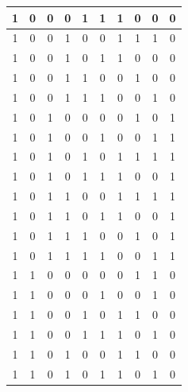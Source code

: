 \documentclass[fleqn]{article}
\begin{document}
\begin{latin}
\begin{center}
\begin{longtable}{|ccc|ccc||ccc|c|}
			1        & 0        & 0        & 0 & 1 & 1 & 1          & 0          & 0          & 0   \\ \hline
			1        & 0        & 0        & 1 & 0 & 0 & 1          & 1          & 1          & 0   \\ \hline
			1        & 0        & 0        & 1 & 0 & 1 & 1          & 0          & 0          & 0   \\ \hline
			1        & 0        & 0        & 1 & 1 & 0 & 0          & 1          & 0          & 0   \\ \hline
			1        & 0        & 0        & 1 & 1 & 1 & 0          & 0          & 1          & 0   \\ \hline
			1        & 0        & 1        & 0 & 0 & 0 & 0          & 1          & 0          & 1   \\ \hline
			1        & 0        & 1        & 0 & 0 & 1 & 0          & 0          & 1          & 1   \\ \hline
			1        & 0        & 1        & 0 & 1 & 0 & 1          & 1          & 1          & 1   \\ \hline
			1        & 0        & 1        & 0 & 1 & 1 & 1          & 0          & 0          & 1   \\ \hline
			1        & 0        & 1        & 1 & 0 & 0 & 1          & 1          & 1          & 1   \\ \hline
			1        & 0        & 1        & 1 & 0 & 1 & 1          & 0          & 0          & 1   \\ \hline
			1        & 0        & 1        & 1 & 1 & 0 & 0          & 1          & 0          & 1   \\ \hline
			1        & 0        & 1        & 1 & 1 & 1 & 0          & 0          & 1          & 1   \\ \hline
			1        & 1        & 0        & 0 & 0 & 0 & 0          & 1          & 1          & 0   \\ \hline
			1        & 1        & 0        & 0 & 0 & 1 & 0          & 0          & 1          & 0   \\ \hline
			1        & 1        & 0        & 0 & 1 & 0 & 1          & 1          & 0          & 0   \\ \hline
			1        & 1        & 0        & 0 & 1 & 1 & 1          & 0          & 1          & 0   \\ \hline
			1        & 1        & 0        & 1 & 0 & 0 & 1          & 1          & 0          & 0   \\ \hline
			1        & 1        & 0        & 1 & 0 & 1 & 1          & 0          & 1          & 0   \\ \hline

\end{longtable}
\end{center}
\end{latin}
\end{document}
